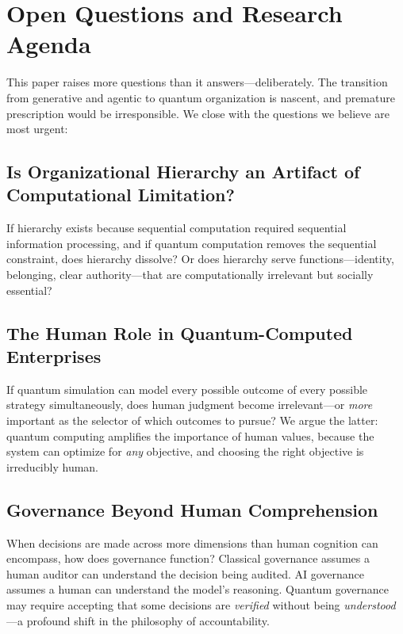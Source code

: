 \documentclass[11pt,a4paper,twocolumn]{article}
\begin{document}
\section{Open Questions and Research Agenda}
\label{sec:questions}

This paper raises more questions than it answers---deliberately. The transition from generative and agentic to quantum organization is nascent, and premature prescription would be irresponsible. We close with the questions we believe are most urgent:

\subsection{Is Organizational Hierarchy an Artifact of Computational Limitation?}

If hierarchy exists because sequential computation required sequential information processing, and if quantum computation removes the sequential constraint, does hierarchy dissolve? Or does hierarchy serve functions---identity, belonging, clear authority---that are computationally irrelevant but socially essential?

\subsection{The Human Role in Quantum-Computed Enterprises}

If quantum simulation can model every possible outcome of every possible strategy simultaneously, does human judgment become irrelevant---or \textit{more} important as the selector of which outcomes to pursue? We argue the latter: quantum computing amplifies the importance of human values, because the system can optimize for \textit{any} objective, and choosing the right objective is irreducibly human.

\subsection{Governance Beyond Human Comprehension}

When decisions are made across more dimensions than human cognition can encompass, how does governance function? Classical governance assumes a human auditor can understand the decision being audited. AI governance assumes a human can understand the model's reasoning. Quantum governance may require accepting that some decisions are \textit{verified} without being \textit{understood}---a profound shift in the philosophy of accountability.
\end{document}
